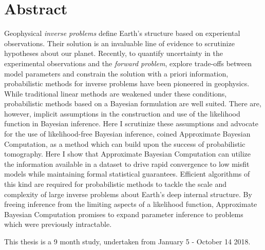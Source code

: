 \chapter{Abstract}

Geophysical \textit{inverse problems} define Earth's structure based on experiental observations. Their solution is an invaluable line of evidence to scrutinize hypotheses about our planet. Recently, to quantify uncertainty in the experimental observations and the \textit{forward problem}, explore trade-offs between model parameters and constrain the solution with a priori information, probabilistic methods for inverse problems have been pioneered in geophysics. While traditional linear methods are weakened under these conditions, probabilistic methods based on a Bayesian formulation are well suited.  There are, however, implicit assumptions in the construction and use of the likelihood function in Bayesian inference. Here I scrutinize these assumptions and advocate for the use of likelihood-free Bayesian inference, coined Approximate Bayesian Computation, as a method which can build upon the success of probabilistic tomography. Here I show that Approximate Bayesian Computation can utilize the information available in a dataset to drive rapid convergence to low misfit models while maintaining formal statistical guarantees. Efficient algorithms of this kind are required for probabilistic methods to tackle the scale and complexity of large inverse problems about Earth’s deep internal structure. By freeing inference from the limiting aspects of a likelihood function, Approximate Bayesian Computation promises to expand parameter inference to problems which were previously intractable. \par
This thesis is a 9 month study, undertaken from January 5 - October 14 2018. 
